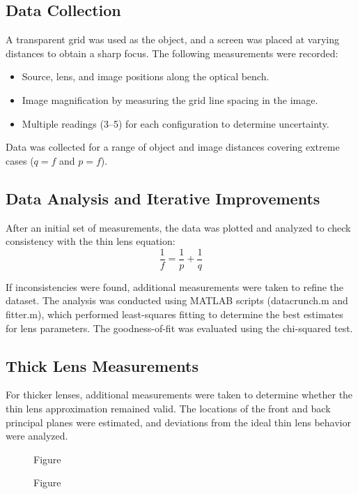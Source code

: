 \documentclass[aip, cp, amsmath, amssymb, reprint, nofootinbib]{revtex4-2}
\begin{document}
\subsection{Data Collection}
A transparent grid was used as the object, and a screen was placed at varying distances to obtain a sharp focus. The following measurements were recorded:
\begin{itemize}
    \item Source, lens, and image positions along the optical bench.
    \item Image magnification by measuring the grid line spacing in the image.
    \item Multiple readings (3–5) for each configuration to determine uncertainty.
\end{itemize}
Data was collected for a range of object and image distances covering extreme cases ($q = f$ and $p = f$).

\subsection{Data Analysis and Iterative Improvements}
After an initial set of measurements, the data was plotted and analyzed to check consistency with the thin lens equation:
\begin{equation}
    \frac{1}{f} = \frac{1}{p} + \frac{1}{q}
\end{equation}

If inconsistencies were found, additional measurements were taken to refine the dataset. The analysis was conducted using MATLAB scripts (datacrunch.m and fitter.m), which performed least-squares fitting to determine the best estimates for lens parameters. The goodness-of-fit was evaluated using the chi-squared test.

\subsection{Thick Lens Measurements}
For thicker lenses, additional measurements were taken to determine whether the thin lens approximation remained valid. The locations of the front and back principal planes were estimated, and deviations from the ideal thin lens behavior were analyzed.


        \begin{figure}[H]
            
            \caption{Figure}
        \end{figure}


        \begin{figure}[H]
            
            \caption{Figure}
        \end{figure}
\end{document}
